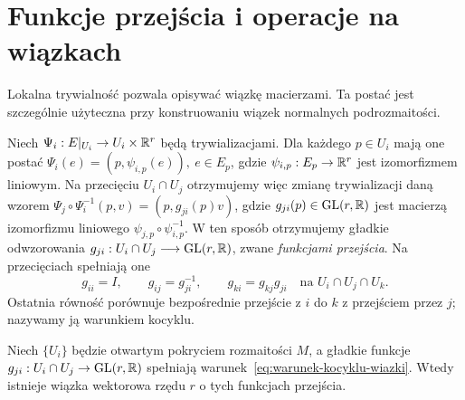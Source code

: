 \section{Funkcje przejścia i operacje na wiązkach}

Lokalna trywialność pozwala opisywać wiązkę macierzami. Ta postać jest
szczególnie użyteczna przy konstruowaniu wiązek normalnych podrozmaitości.

Niech $\Psi_i:E|_{U_i}\to U_i\times\mathbb{R}^r$ będą trywializacjami.
Dla każdego $p\in U_i$ mają one postać $\Psi_i(e)=(p,\psi_{i,p}(e)),\ e\in E_p$,
gdzie $\psi_{i,p}:E_p\to\mathbb{R}^r$ jest izomorfizmem liniowym.
Na przecięciu $U_i\cap U_j$ otrzymujemy więc zmianę trywializacji daną wzorem $\Psi_j\circ\Psi_i^{-1}(p,v)=(p,g_{ji}(p)v)$,
gdzie $g_{ji}(p)\in\mathrm{GL}(r,\mathbb{R})$ jest macierzą izomorfizmu
liniowego $\psi_{j,p}\circ\psi_{i,p}^{-1}$.
W ten sposób otrzymujemy gładkie odwzorowania $g_{ji}:U_i\cap U_j\longrightarrow\mathrm{GL}(r,\mathbb{R})$,
zwane \emph{funkcjami przejścia}. Na przecięciach spełniają one
\begin{equation}\label{eq:warunek-kocyklu-wiazki}
g_{ii}=I,\qquad g_{ij}=g_{ji}^{-1},\qquad
g_{ki}=g_{kj}g_{ji}\quad\text{na }U_i\cap U_j\cap U_k.
\end{equation}
Ostatnia równość porównuje bezpośrednie przejście z $i$ do $k$
z przejściem przez $j$; nazywamy ją warunkiem kocyklu.


\begin{twierdzenie}
Niech $\{U_i\}$ będzie otwartym pokryciem rozmaitości $M$, a gładkie funkcje
$g_{ji}:U_i\cap U_j\to\mathrm{GL}(r,\mathbb{R})$ spełniają
warunek~\eqref{eq:warunek-kocyklu-wiazki}. Wtedy istnieje
wiązka wektorowa rzędu $r$ o tych funkcjach przejścia.
\end{twierdzenie}


